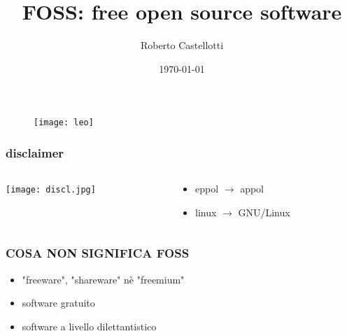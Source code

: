 \documentclass{beamer}
\title{FOSS: free open source software}
\author{Roberto Castellotti}
\date{\today}
\institute{L.S.S G.D Cassini}
\begin{document}
  
\begin{frame}[plain]
\end{frame}
\begin{frame}[plain]
    \begin{figure} 
            \texttt{[image: leo]}
    
    \end{figure}   
\end{frame}
\begin{frame} 
    \frametitle{disclaimer}
        \begin{columns} 
            \begin{column}{0.5\textwidth}
                \begin{center}
            \texttt{[image: discl.jpg]}
                \end{center}
        \end{column}
        \begin{column}{0.5\textwidth}  
                \begin{itemize}
                    \item eppol $\rightarrow$ appol
                    \item linux $\rightarrow$ GNU/Linux
                \end{itemize}
            \end{column}
        \end{columns}
    \end{frame}


\begin{frame}
    \frametitle{COSA NON SIGNIFICA FOSS}
        \begin{itemize}
            \item "freeware", "shareware" nè "freemium"
            \item software gratuito
            \item software a livello dilettantistico
        \end{itemize}
		
\end{frame}
\end{document}
